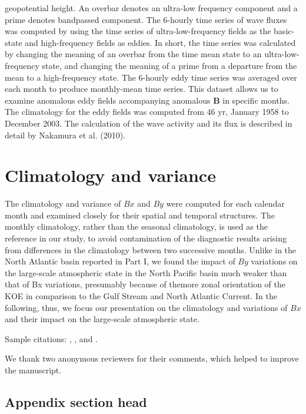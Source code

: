 \documentclass{ametsoc}
\begin{document}
geopotential height. An overbar denotes an ultra-low frequency
component and a prime denotes bandpassed
component. The 6-hourly time series of wave fluxes was
computed by using the time series of ultra-low-frequency
fields as the basic-state and high-frequency fields as eddies.
In short, the time series was calculated by changing the
meaning of an overbar from the time mean state to an
ultra-low-frequency state, and changing the meaning of a
prime from a departure from the mean to a high-frequency
state. The 6-hourly eddy time series was averaged over each
month to produce monthly-mean time series. This dataset
allows us to examine anomalous eddy fields accompanying
anomalous $\mathbf B$ in specific months. The climatology for
the eddy fields was computed from 46 yr, January 1958 to
December 2003. The calculation of the wave activity and
its flux is described in detail by Nakamura et al. (2010).


\section{Climatology and variance}
The climatology and variance of $Bx$ and $By$ were computed
for each calendar month and examined closely for
their spatial and temporal structures. The monthly climatology,
rather than the seasonal climatology, is used as the
reference in our study, to avoid contamination of the diagnostic
results arising from differences in the climatology
between two successive months. Unlike in the North Atlantic
basin reported in Part I, we found the impact of $By$
variations on the large-scale atmospheric state in the
North Pacific basin much weaker than that of Bx variations,
presumably because of themore zonal orientation of
the KOE in comparison to the Gulf Stream and North
Atlantic Current. In the following, thus, we focus our
presentation on the climatology and variations of $Bx$ and
their impact on the large-scale atmospheric state.

Sample citations: \citet{Becker+Schmitz2003}, \citet{Knutti2008},
and \citep{MeixnerEA2002,Kuji_Nakajima2002,EmeryEA1986}.


\acknowledgments
We thank two anonymous reviewers for their comments, which helped
to improve the manuscript.

\appendix
{}

\subsection*{Appendix section head}
\end{document}
